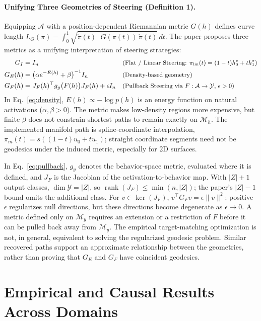 \documentclass[10pt,a4paper]{article}
\newcommand{\Mh}{\mathcal{M}_h}
\newcommand{\My}{\mathcal{M}_y}
\begin{document}
\paragraph{Unifying Three Geometries of Steering (Definition 1).}
Equipping $\mathcal{A}$ with a position-dependent Riemannian metric $G(h)$ defines curve length $L_G(\pi) = \int_0^1 \sqrt{\dot{\pi}(t)^\top G(\pi(t))\,\dot{\pi}(t)}\,dt$. The paper proposes three metrics as a unifying interpretation of steering strategies:
\begin{align}
    G_I &= I_n && \text{\small(Flat / Linear Steering: $\pi_{\mathrm{lin}}(t) = (1-t)h_0^\star + t h_1^\star$)} \label{eq:flat}\\
    G_E(h) &= \bigl(\alpha e^{-E(h)} + \beta\bigr)^{-1} I_n && \text{\small(Density-based geometry)} \label{eq:density}\\
    G_F(h) &= J_F(h)^\top g_y\bigl(F(h)\bigr) J_F(h) + \epsilon I_n && \text{\small(Pullback Steering via $F : \mathcal{A} \to \mathcal{Y}$, $\epsilon > 0$)} \label{eq:pullback}
\end{align}
In Eq.~\eqref{eq:density}, $E(h) \propto -\log p(h)$ is an energy function on natural activations ($\alpha,\beta > 0$). The metric makes low-density regions more expensive, but finite $\beta$ does not constrain shortest paths to remain exactly on $\Mh$. The implemented manifold path is spline-coordinate interpolation, $\pi_m(t)=s((1-t)u_0+t u_1)$; straight coordinate segments need not be geodesics under the induced metric, especially for 2D surfaces.

In Eq.~\eqref{eq:pullback}, $g_y$ denotes the behavior-space metric, evaluated where it is defined, and $J_F$ is the Jacobian of the activation-to-behavior map. With $|Z|+1$ output classes, $\dim\mathcal{Y}=|Z|$, so $\operatorname{rank}(J_F)\leq\min(n,|Z|)$; the paper's $|Z|-1$ bound omits the additional class. For $v\in\ker(J_F)$, $v^\top G_Fv=\epsilon\|v\|^2$: positive $\epsilon$ regularizes null directions, but these directions become degenerate as $\epsilon\to0$. A metric defined only on $\My$ requires an extension or a restriction of $F$ before it can be pulled back away from $\My$. The empirical target-matching optimization is not, in general, equivalent to solving the regularized geodesic problem. Similar recovered paths support an approximate relationship between the geometries, rather than proving that $G_E$ and $G_F$ have coincident geodesics.

\section{Empirical and Causal Results Across Domains}
\end{document}
